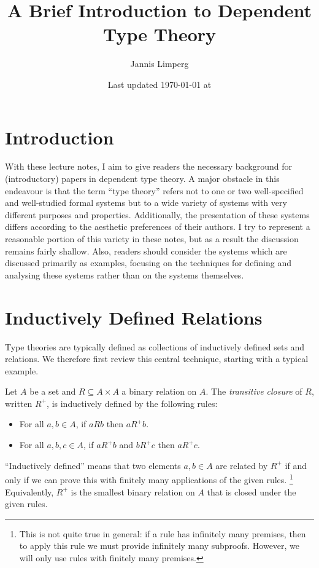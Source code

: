 \documentclass{scrartcl}
\theoremstyle{definition}
\begin{document}
\title{A Brief Introduction to Dependent Type Theory}
\author{Jannis Limperg}
\date{Last updated \today{} at \currenttime}
\maketitle

\section{Introduction}

With these lecture notes, I aim to give readers the necessary background for (introductory) papers in dependent type theory.
A major obstacle in this endeavour is that the term \enquote{type theory} refers not to one or two well-specified and well-studied formal systems but to a wide variety of systems with very different purposes and properties.
Additionally, the presentation of these systems differs according to the aesthetic preferences of their authors.
I try to represent a reasonable portion of this variety in these notes, but as a result the discussion remains fairly shallow.
Also, readers should consider the systems which are discussed primarily as examples, focusing on the techniques for defining and analysing these systems rather than on the systems themselves.

\section{Inductively Defined Relations}%
\label{sec:indrel}

Type theories are typically defined as collections of inductively defined sets and relations.
We therefore first review this central technique, starting with a typical example.

\begin{definition}
  Let $A$ be a set and $R ⊆ A × A$ a binary relation on $A$.
  The \emph{transitive closure} of $R$, written $R^{+}$, is inductively defined by the following rules:
  \begin{itemize}
    \item For all $a,b ∈ A$, if $aRb$ then $aR^{+}b$.
    \item For all $a,b,c ∈ A$, if $aR^{+}b$ and $bR^{+}c$ then $aR^{+}c$.
  \end{itemize}
\end{definition}

\enquote{Inductively defined} means that two elements $a,b ∈ A$ are related by $R^{+}$ if and only if we can prove this with finitely many applications of the given rules.%
\footnote{This is not quite true in general: if a rule has infinitely many premises, then to apply this rule we must provide infinitely many subproofs.
  However, we will only use rules with finitely many premises.}
Equivalently, $R^{+}$ is the smallest binary relation on $A$ that is closed under the given rules.
\end{document}
